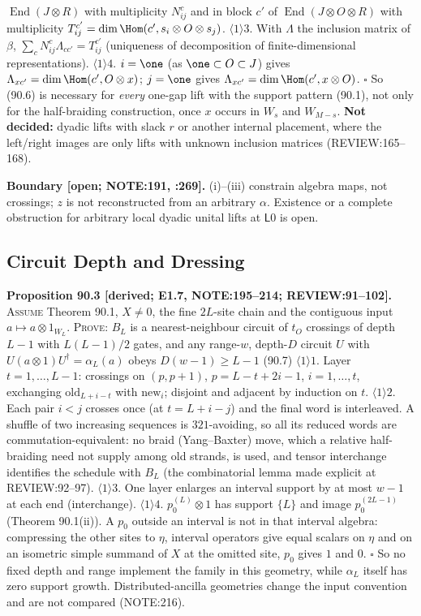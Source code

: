 \(\operatorname{End}(J\otimes R)\) with multiplicity \(N_{ij}^c\) and in block \(c'\) of \(\operatorname{End}(J\otimes O\otimes
R)\) with multiplicity \(T_{ij}^{c'}=\dim\Hom(c',s_i\otimes O\otimes s_j)\).
\(\langle1\rangle3\). With \(\Lambda\) the inclusion matrix of \(\beta\), \(\sum_cN_{ij}^c\Lambda_{cc'}=T_{ij}^{c'}\) (uniqueness
of decomposition of finite-dimensional representations).
\(\langle1\rangle4\). \(i=\one\) (as \(\one\subset O\subset J\)) gives \(\Lambda_{xc'}=\dim\Hom(c',O\otimes x)\); \(j=\one\) gives
\(\Lambda_{xc'}=\dim\Hom(c',x\otimes O)\).  \(\square\)
So (90.6) is necessary for \emph{every} one-gap lift with the support pattern (90.1), not only for the half-braiding
construction, once \(x\) occurs in \(W_s\) and \(W_{M-s}\).  \textbf{Not decided:} dyadic lifts with slack \(r\) or another
internal placement, where the left/right images are only lifts with unknown inclusion matrices (REVIEW:165--168).

\textbf{Boundary [open; NOTE:191, :269].}  (i)--(iii) constrain algebra maps, not crossings; \(z\) is not reconstructed
from an arbitrary \(\alpha\).  Existence or a complete obstruction for arbitrary local dyadic unital lifts at \(\mathsf L0\) is open.

\subsection{Circuit Depth and Dressing}

\textbf{Proposition 90.3 [derived; E1.7, NOTE:195--214; REVIEW:91--102].}  \textsc{Assume} Theorem 90.1, \(X\ne0\), the fine
\(2L\)-site chain and the contiguous input \(a\mapsto a\otimes1_{W_L}\).  \textsc{Prove}: \(B_L\) is a nearest-neighbour
circuit of \(t_O\) crossings of depth \(L-1\) with \(L(L-1)/2\) gates, and any range-\(w\), depth-\(D\) circuit \(U\) with
\(U(a\otimes1)U^\dagger=\alpha_L(a)\) obeys \(D(w-1)\ge L-1\) \hfill\textup{(90.7)}
\(\langle1\rangle1\). Layer \(t=1,\dots,L-1\): crossings on \((p,p+1)\), \(p=L-t+2i-1\), \(i=1,\dots,t\), exchanging
\(\mathrm{old}_{L+i-t}\) with \(\mathrm{new}_i\); disjoint and adjacent by induction on \(t\).
\(\langle1\rangle2\). Each pair \(i<j\) crosses once (at \(t=L+i-j\)) and the final word is interleaved.  A shuffle of two
increasing sequences is \(321\)-avoiding, so all its reduced words are commutation-equivalent: no braid
(Yang--Baxter) move, which a relative half-braiding need not supply among old strands, is used, and tensor interchange
identifies the schedule with \(B_L\) (the combinatorial lemma made explicit at REVIEW:92--97).
\(\langle1\rangle3\). One layer enlarges an interval support by at most \(w-1\) at each end (interchange).
\(\langle1\rangle4\). \(p_0^{(L)}\otimes1\) has support \(\{L\}\) and image \(p_0^{(2L-1)}\) (Theorem 90.1(ii)).  A \(p_0\) outside an
interval is not in that interval algebra: compressing the other sites to \(\eta\), interval operators give equal scalars on
\(\eta\) and on an isometric simple summand of \(X\) at the omitted site, \(p_0\) gives \(1\) and \(0\).  \(\square\)
So no fixed depth and range implement the family in this geometry, while \(\alpha_L\) itself has zero support growth.
Distributed-ancilla geometries change the input convention and are not compared (NOTE:216).

